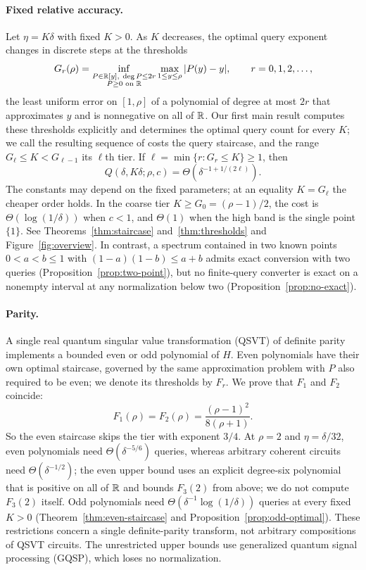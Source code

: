 \paragraph{Fixed relative accuracy.}
Let $\eta=K\delta$ with fixed $K>0$. As $K$ decreases, the optimal query exponent changes in discrete steps at the thresholds
\[
 G_r(\rho)=\inf_{\substack{P\in\mathbb R[y],\ \deg P\leq2r\\ P\geq0\text{ on }\mathbb R}}
                \max_{1\leq y\leq\rho}|P(y)-y|,
 \qquad r=0,1,2,\ldots,
\]
the least uniform error on $[1,\rho]$ of a polynomial of degree at most $2r$ that approximates $y$ and is nonnegative on all of $\mathbb R$. Our first main result computes these thresholds explicitly and determines the optimal query count for every $K$; we call the resulting sequence of costs the query staircase, and the range $G_\ell\leq K<G_{\ell-1}$ its $\ell$th tier. If $\ell=\min\{r:G_r\leq K\}\geq1$, then
\[
 Q(\delta,K\delta;\rho,c)=\Theta(\delta^{-1+1/(2\ell)}).
\]
The constants may depend on the fixed parameters; at an equality $K=G_\ell$ the cheaper order holds. In the coarse tier $K\geq G_0=(\rho-1)/2$, the cost is $\Theta(\log(1/\delta))$ when $c<1$, and $\Theta(1)$ when the high band is the single point $\{1\}$. See Theorems~\ref{thm:staircase} and~\ref{thm:thresholds} and Figure~\ref{fig:overview}. In contrast, a spectrum contained in two known points $0<a<b\leq1$ with $(1-a)(1-b)\leq a+b$ admits exact conversion with two queries (Proposition~\ref{prop:two-point}), but no finite-query converter is exact on a nonempty interval at any normalization below two (Proposition~\ref{prop:no-exact}).

\paragraph{Parity.}
A single real quantum singular value transformation (QSVT) of definite parity implements a bounded even or odd polynomial of $H$. Even polynomials have their own optimal staircase, governed by the same approximation problem with $P$ also required to be even; we denote its thresholds by $F_r$. We prove that $F_1$ and $F_2$ coincide:
\[
 F_1(\rho)=F_2(\rho)=\frac{(\rho-1)^2}{8(\rho+1)}.
\]
So the even staircase skips the tier with exponent $3/4$. At $\rho=2$ and $\eta=\delta/32$, even polynomials need $\Theta(\delta^{-5/6})$ queries, whereas arbitrary coherent circuits need $\Theta(\delta^{-1/2})$; the even upper bound uses an explicit degree-six polynomial that is positive on all of $\mathbb R$ and bounds $F_3(2)$ from above; we do not compute $F_3(2)$ itself. Odd polynomials need $\Theta(\delta^{-1}\log(1/\delta))$ queries at every fixed $K>0$ (Theorem~\ref{thm:even-staircase} and Proposition~\ref{prop:odd-optimal}). These restrictions concern a single definite-parity transform, not arbitrary compositions of QSVT circuits. The unrestricted upper bounds use generalized quantum signal processing (GQSP), which loses no normalization.

